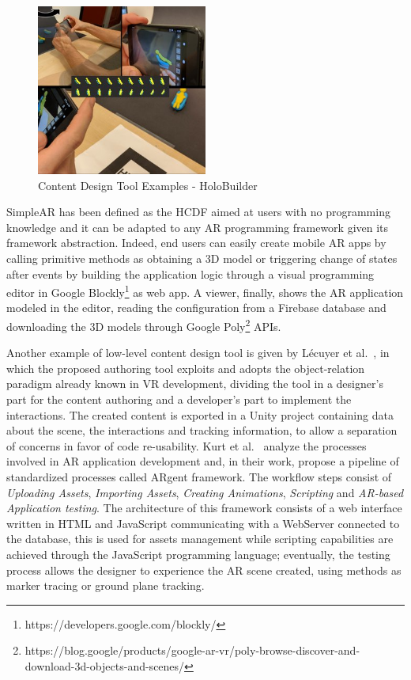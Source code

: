 \begin{figure}[h]
    \centering
    \includegraphics[width=0.5\textwidth]{Figures/Background/tools/Holobuilder.jpg}
    \caption{Content Design Tool Examples - HoloBuilder}
    \label{fig:holobuilder}
\end{figure}

SimpleAR has been defined as the \gls{HCDF} aimed at users with no programming knowledge \cite{apaza-yllachura_simplear_2019} and it can be adapted to any AR programming framework given its framework abstraction. Indeed, end users can easily create mobile AR apps by calling primitive methods as obtaining a 3D model or triggering change of states after events by building the application logic through a visual programming editor in Google Blockly\footnote{https://developers.google.com/blockly/} as web app. A viewer, finally, shows the AR application modeled in the editor, reading the configuration from a Firebase database and downloading the 3D models through Google Poly\footnote{https://blog.google/products/google-ar-vr/poly-browse-discover-and-download-3d-objects-and-scenes/} APIs.

Another example of low-level content design tool is given by Lécuyer et al.~\cite{lecuyer_authoring_2019}, in which the proposed authoring tool exploits and adopts the object-relation paradigm already known in VR development, dividing the tool in a designer's part for the content authoring and a developer's part to implement the interactions. The created content is exported in a Unity project containing data about the scene, the interactions and tracking information, to allow a separation of concerns in favor of code re-usability.
Kurt et al.~\cite{kurt_argent_2020} analyze the processes involved in AR application development and, in their work, propose a pipeline of standardized processes called ARgent framework. The workflow steps consist of \textit{Uploading Assets}, \textit{Importing Assets}, \textit{Creating Animations}, \textit{Scripting} and \textit{AR-based Application testing}. The architecture of  this framework consists of a web interface written in HTML and JavaScript communicating with a WebServer connected to the database, this is used for assets management while scripting capabilities are achieved through the JavaScript programming language; eventually, the testing process allows the designer to experience the AR scene created, using methods as marker tracing or ground plane tracking.

